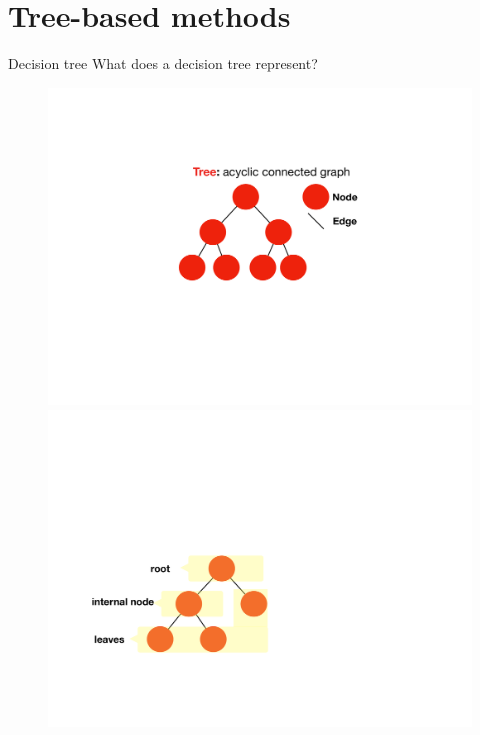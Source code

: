 \documentclass[notes]{beamer}          %
\begin{document}
\section{Tree-based methods}
\begin{frame}{Decision tree}
What does a decision tree represent?
\begin{figure}
  \includegraphics[width=\linewidth]{figures/week_6/tree-example-a.pdf}  
\endminipage\hfill
{}
  \includegraphics[width=\linewidth]{figures/week_6/tree-example-b.pdf}  
\endminipage\hfill
{}%

\end{figure}
\end{frame}
\end{document}
